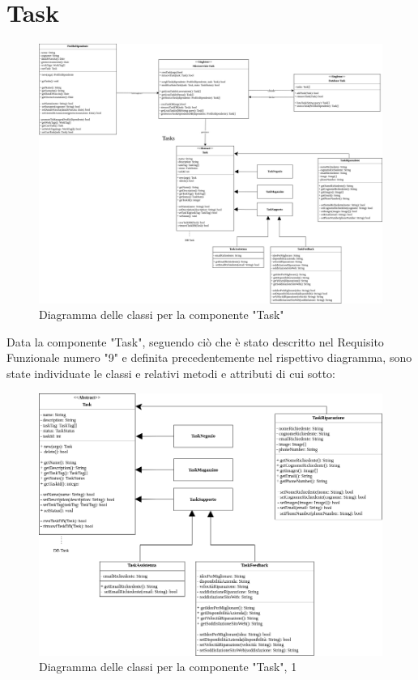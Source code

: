 \documentclass{report}
\begin{document}
\section{Task}

\begin{figure}[H]
	\centering\includegraphics[width=1\textwidth]{images/Diagramma_delle_classi_task.png}
	Diagramma delle classi per la componente "Task"
\end{figure}
Data la componente "Task", seguendo ciò che è stato descritto nel Requisito Funzionale numero "9" e definita precedentemente nel rispettivo diagramma, sono state individuate le classi e relativi metodi e attributi di cui sotto:

\begin{figure}[H]
	\centering\includegraphics[width=1.2\textwidth]{images/Diagramma_delle_classi_task1.png}
	Diagramma delle classi per la componente "Task", 1
\end{figure}
\end{document}
